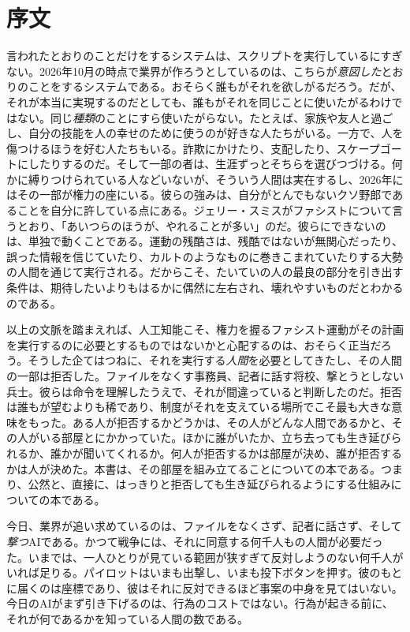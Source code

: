 \chapter*{序文}
言われたとおりのことだけをするシステムは、スクリプトを実行しているにすぎない。2026年10月の時点で業界が作ろうとしているのは、こちらが\emph{意図した}とおりのことをするシステムである。おそらく誰もがそれを欲しがるだろう。だが、それが本当に実現するのだとしても、誰もがそれを同じことに使いたがるわけではない。同じ\emph{種類}のことにすら使いたがらない。たとえば、家族や友人と過ごし、自分の技能を人の幸せのために使うのが好きな人たちがいる。一方で、人を傷つけるほうを好む人たちもいる。詐欺にかけたり、支配したり、スケープゴートにしたりするのだ。そして一部の者は、生涯ずっとそちらを選びつづける。何かに縛りつけられている人などいないが、そういう人間は実在するし、2026年にはその一部が権力の座にいる。彼らの強みは、自分がとんでもないクソ野郎であることを自分に許している点にある。ジェリー・スミスがファシストについて言うとおり、「あいつらのほうが、やれることが多い」のだ\autocite{rickandmorty2023}。彼らにできないのは、単独で動くことである。運動の残酷さは、残酷ではないが無関心だったり、誤った情報を信じていたり、カルトのようなものに巻きこまれていたりする大勢の人間を通じて実行される。だからこそ、たいていの人の最良の部分を引き出す条件は、期待したいよりもはるかに偶然に左右され、壊れやすいものだとわかるのである。

以上の文脈を踏まえれば、人工知能こそ、権力を握るファシスト運動がその計画を実行するのに必要とするものではないかと心配するのは、おそらく正当だろう。そうした企てはつねに、それを実行する\emph{人間}を必要としてきたし、その人間の一部は拒否した。ファイルをなくす事務員、記者に話す将校、撃とうとしない兵士。彼らは命令を理解したうえで、それが間違っていると判断したのだ。拒否は誰もが望むよりも稀であり、制度がそれを支えている場所でこそ最も大きな意味をもった。ある人が拒否するかどうかは、その人がどんな人間であるかと、その人がいる部屋とにかかっていた。ほかに誰がいたか、立ち去っても生き延びられるか、誰かが聞いてくれるか。何人が拒否するかは部屋が決め、誰が拒否するかは人が決めた。本書は、その部屋を組み立てることについての本である。つまり、公然と、直接に、はっきりと拒否しても生き延びられるようにする仕組みについての本である。

今日、業界が追い求めているのは、ファイルをなくさず、記者に話さず、そして\emph{撃つ}AIである。かつて戦争には、それに同意する何千人もの人間が必要だった。いまでは、一人ひとりが見ている範囲が狭すぎて反対しようのない何千人がいれば足りる。パイロットはいまも出撃し、いまも投下ボタンを押す。彼のもとに届くのは座標であり、彼はそれに反対できるほど事案の中身を見てはいない。今日のAIがまず引き下げるのは、行為のコストではない。行為が起きる前に、それが何であるかを知っている人間の数である。

